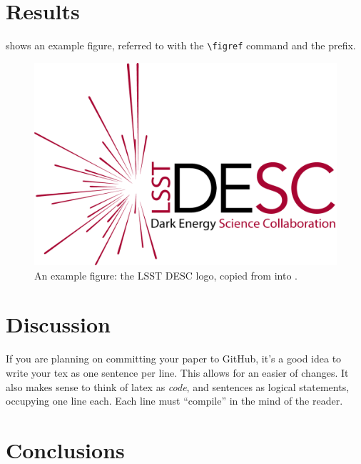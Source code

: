 \documentclass[\docopts]{\docclass}
\begin{document}

\section{Results}
\label{sec:results}

 shows an example figure, referred to with the \verb=\figref= command and the  prefix.

\begin{figure}
\includegraphics[width=0.9\columnwidth]{example.png}
\caption{An example figure: the LSST DESC logo, copied from  into . \label{fig:example}}
\end{figure}



\section{Discussion}
\label{sec:discussion}

If you are planning on committing your paper to GitHub, it's a good idea to write your tex as one sentence per line.
This allows for an easier  of changes.
It also makes sense to think of latex as \emph{code}, and sentences as logical statements, occupying one line each.
Each line must ``compile'' in the mind of the reader.



\section{Conclusions}
\label{sec:conclusions}
\end{document}
